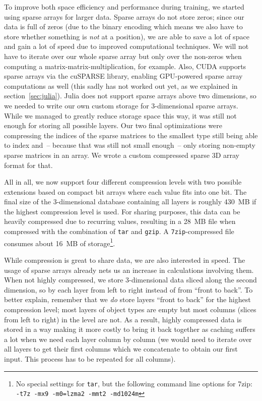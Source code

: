 To improve both space efficiency and performance during training, we
started using sparse arrays for larger data. Sparse arrays do not
store zeros; since our data is full of zeros (due to the binary
encoding which means we also have to store whether something is
\emph{not} at a position), we are able to save a lot of space and gain
a lot of speed due to improved computational techniques. We will not
have to iterate over our whole sparse array but only over the
non-zeros when computing a matrix-matrix-multiplication, for example.
Also, CUDA supports sparse arrays via the cuSPARSE library, enabling
GPU-powered sparse array computations as well (this sadly has not
worked out yet, as we explained in section~\ref{sec:julia}).
Julia does not support sparse arrays above two dimensions, so we
needed to write our own custom storage for 3-dimensional sparse
arrays. While we managed to greatly reduce storage space this way, it
was still not enough for storing all possible layers. Our two final
optimizations were compressing the indices of the sparse matrices to
the smallest type still being able to index and~-- because that was
still not small enough~-- only storing non-empty sparse matrices in an
array. We wrote a custom compressed sparse 3D array format for that.

All in all, we now support four different compression levels with two
possible extensions based on compact bit arrays where each value fits
into one bit. The final size of the 3-dimensional database containing
all layers is roughly 430~MB if the highest compression level is used.
For sharing purposes, this data can be heavily compressed due to
recurring values, resulting in a 28~MB file when compressed with the
combination of \texttt{tar} and \texttt{gzip}. A
\texttt{7zip}-compressed file consumes about 16~MB of
storage\footnote{No special settings for \texttt{tar}, but the
  following command line options for 7zip: \texttt{-t7z -mx9 -m0=lzma2
    -mmt2 -md1024m}}.
\medskip

While compression is great to share data, we are also interested in
speed. The usage of sparse arrays already nets us an increase in
calculations involving them. When not highly compressed, we store
3-dimensional data sliced along the second dimension, so by each layer
from left to right instead of from ``front to back''. To better
explain, remember that we \emph{do} store layers ``front to back'' for
the highest compression level; most layers of object types are empty
but most columns (slices from left to right) in the level are
not. %
As a result, highly compressed data is stored in a way making it more
costly to bring it back together as caching suffers a lot when we need
each layer column by column (we would need to iterate over all layers
to get their first columns which we concatenate to obtain our first
input. This process has to be repeated for all columns).

